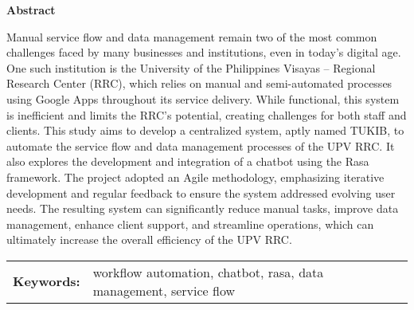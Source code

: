 \begin{center}
\textbf{Abstract}
\end{center}
\setlength{\parindent}{0pt}
Manual service flow and data management remain two of the most common challenges faced by many businesses and institutions, even in today’s digital age. One such institution is the University of the Philippines Visayas – Regional Research Center (RRC), which relies on manual and semi-automated processes using Google Apps throughout its service delivery. While functional, this system is inefficient and limits the RRC’s potential, creating challenges for both staff and clients. This study aims to develop a centralized system, aptly named TUKIB, to automate the service flow and data management processes of the UPV RRC. It also explores the development and integration of a chatbot using the Rasa framework. The project adopted an Agile methodology, emphasizing iterative development and regular feedback to ensure the system addressed evolving user needs. The resulting system can significantly reduce manual tasks, improve data management, enhance client support, and streamline operations, which can ultimately increase the overall efficiency of the UPV RRC.

\begin{tabular}{lp{4.25in}}
\hspace{-0.5em}\textbf{Keywords:}\hspace{0.25em} & workflow automation, chatbot, rasa, data management, service flow\\
\end{tabular}